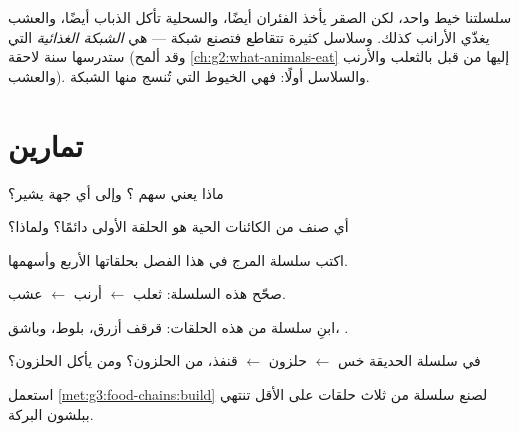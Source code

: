 \begin{remark}\label{rem:g3:food-chains:web}
سلسلتنا خيط واحد، لكن الصقر يأخذ الفئران أيضًا، والسحلية تأكل
الذباب أيضًا، والعشب يغذّي الأرانب كذلك. وسلاسل كثيرة تتقاطع
فتصنع شبكة --- هي \emph{الشبكة الغذائية} التي ستدرسها سنة لاحقة
(وقد ألمح \cref{ch:g2:what-animals-eat} إليها من قبل بالثعلب
والأرنب والعشب). والسلاسل أولًا: فهي الخيوط التي تُنسج منها
الشبكة.
\end{remark}

\section{تمارين}

\begin{exercise}[$\star$]\label{exo:g3:food-chains:1}
ماذا يعني سهم ؟ وإلى أي جهة يشير؟
\end{exercise}

\begin{exercise}[$\star$]\label{exo:g3:food-chains:2}
أي صنف من الكائنات الحية هو الحلقة الأولى دائمًا؟ ولماذا؟
\end{exercise}

\begin{exercise}[$\star$]\label{exo:g3:food-chains:3}
اكتب سلسلة المرج في هذا الفصل بحلقاتها الأربع وأسهمها.
\end{exercise}

\begin{exercise}[$\star$]\label{exo:g3:food-chains:4}
صحّح هذه السلسلة: ثعلب $\leftarrow$ أرنب $\leftarrow$
عشب.
\end{exercise}

\begin{exercise}[$\star$]\label{exo:g3:food-chains:5}
ابنِ سلسلة من هذه الحلقات: قرقف أزرق،  بلوط، وباشق،
.
\end{exercise}

\begin{exercise}[$\star$]\label{exo:g3:food-chains:6}
في سلسلة الحديقة خس $\leftarrow$ حلزون $\leftarrow$
قنفذ، من  الحلزون؟ ومن يأكل الحلزون؟
\end{exercise}

\begin{exercise}[$\star$]\label{exo:g3:food-chains:7}
استعمل \cref{met:g3:food-chains:build} لصنع سلسلة من ثلاث حلقات
على الأقل تنتهي ببلشون البركة.
\end{exercise}

